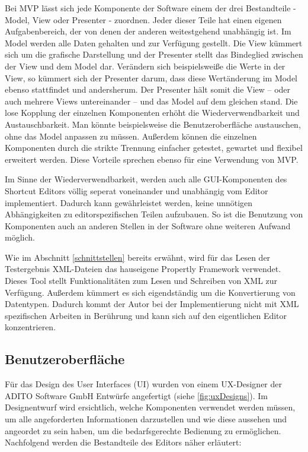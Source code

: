 Bei MVP lässt sich jede Komponente der Software einem der drei Bestandteile - Model, View oder Presenter - zuordnen. Jeder dieser Teile hat einen eigenen Aufgabenbereich, der von denen der anderen weitestgehend unabhängig ist. Im Model werden alle Daten gehalten und zur Verfügung gestellt. Die View kümmert sich um die grafische Darstellung und der Presenter stellt das Bindeglied zwischen der View und dem Model dar. Verändern sich beispielsweiße die Werte in der View, so kümmert sich der Presenter darum, dass diese Wertänderung im Model ebenso stattfindet und andersherum. Der Presenter hält somit die View -- oder auch mehrere Views untereinander -- und das Model auf dem gleichen stand. Die lose Kopplung der einzelnen Komponenten erhöht die Wiederverwendbarkeit und Austauschbarkeit. Man könnte beispielsweise die Benutzeroberfläche austauschen, ohne das Model anpassen zu müssen. Außerdem können die einzelnen Komponenten durch die strikte Trennung einfacher getestet, gewartet und flexibel erweitert werden. Diese Vorteile sprechen ebenso für eine Verwendung von MVP.

\vfill

Im Sinne der Wiederverwendbarkeit, werden auch alle GUI-Komponenten des Shortcut Editors völlig seperat voneinander und unabhängig vom Editor implementiert. Dadurch kann gewährleistet werden, keine unnötigen Abhängigkeiten zu editorspezifischen Teilen aufzubauen. So ist die Benutzung von Komponenten auch an anderen Stellen in der Software ohne weiteren Aufwand möglich.

\vfill

Wie im Abschnitt \ref{schnittstellen} bereits erwähnt, wird für das Lesen der Testergebnis XML-Dateien das hauseigene Propertly Framework verwendet. Dieses Tool stellt Funktionalitäten zum Lesen und Schreiben von XML zur Verfügung. Außerdem kümmert es sich eigendständig um die Konvertierung von Datentypen. Dadurch kommt der Autor bei der Implementierung nicht mit XML spezifischen Arbeiten in Berührung und kann sich auf den eigentlichen Editor konzentrieren.

\newpage

\subsection{Benutzeroberfläche}
\label{ui}

Für das Design des User Interfaces (UI) wurden von einem UX-Designer der ADITO Software GmbH Entwürfe angefertigt (siehe \autoref{fig:uxDesigns}). Im Designentwurf wird ersichtlich, welche Komponenten verwendet werden müssen, um alle angeforderten Informationen darzustellen und wie diese aussehen und angeordet zu sein haben, um die bedarfsgerechte Bedienung zu ermöglichen. Nachfolgend werden die Bestandteile des Editors näher erläutert:

